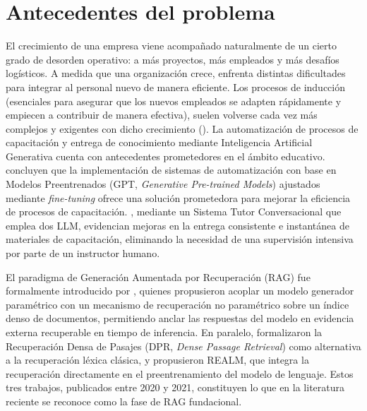 \section{Antecedentes del problema}

El crecimiento de una empresa viene acompañado naturalmente de un cierto grado de desorden operativo: a más proyectos, más empleados y más desafíos logísticos. A medida que una organización crece, enfrenta distintas dificultades para integrar al personal nuevo de manera eficiente. Los procesos de inducción (esenciales para asegurar que los nuevos empleados se adapten rápidamente y empiecen a contribuir de manera efectiva), suelen volverse cada vez más complejos y exigentes con dicho crecimiento (\cite{Achury2016induccion}). La automatización de procesos de capacitación y entrega de conocimiento mediante Inteligencia Artificial Generativa cuenta con antecedentes prometedores en el ámbito educativo. \textcite{Zamfirescu2023_GAIED} concluyen que la implementación de sistemas de automatización con base en Modelos Preentrenados (GPT, \textit{Generative Pre-trained Models}) ajustados mediante \textit{fine-tuning} ofrece una solución prometedora para mejorar la eficiencia de procesos de capacitación. \textcite{Schmucker2023_GAIED}, mediante un Sistema Tutor Conversacional que emplea dos LLM, evidencian mejoras en la entrega consistente e instantánea de materiales de capacitación, eliminando la necesidad de una supervisión intensiva por parte de un instructor humano. 

El paradigma de Generación Aumentada por Recuperación (RAG) fue formalmente introducido por \textcite{Lewis2020rag}, quienes propusieron acoplar un modelo generador paramétrico con un mecanismo de recuperación no paramétrico sobre un índice denso de documentos, permitiendo anclar las respuestas del modelo en evidencia externa recuperable en tiempo de inferencia. En paralelo, \textcite{Karpukhin2020_DPR} formalizaron la Recuperación Densa de Pasajes (DPR, \textit{Dense Passage Retrieval}) como alternativa a la recuperación léxica clásica, y \textcite{Guu2020_REALM} propusieron REALM, que integra la recuperación directamente en el preentrenamiento del modelo de lenguaje. Estos tres trabajos, publicados entre 2020 y 2021, constituyen lo que en la literatura reciente se reconoce como la fase de \textquotedbl{}RAG fundacional\textquotedbl{}.

